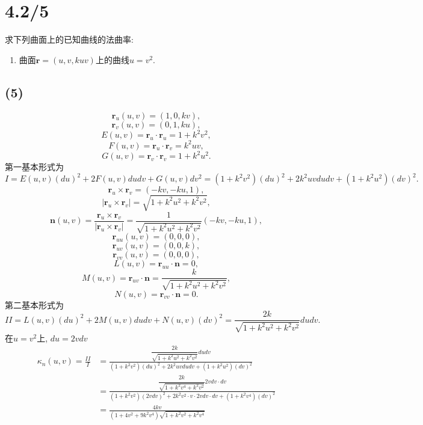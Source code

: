 \documentclass[11pt,a4paper]{article}
\begin{document}
\section{4.2/5}
\begin{problem}
求下列曲面上的已知曲线的法曲率:
\begin{enumerate}
  \addtocounter{enumi}{4}
  \item 曲面$\mathbf{r}=(u,v,kuv)$上的曲线$u=v^2$.
\end{enumerate}
\end{problem}

\subsection*{(5)}
$$\mathbf{r}_u(u,v)=(1,0,kv),$$
$$\mathbf{r}_v(u,v)=(0,1,ku),$$
$$E(u,v)=\mathbf{r}_u\cdot \mathbf{r}_u=1+k^2v^2,$$
$$F(u,v)=\mathbf{r}_u\cdot \mathbf{r}_v=k^2uv,$$
$$G(u,v)=\mathbf{r}_v\cdot \mathbf{r}_v=1+k^2u^2.$$
第一基本形式为
$$I=E(u,v)(du)^2+2F(u,v)dudv+G(u,v)dv^2=(1+k^2v^2)(du)^2+2k^2uvdudv+(1+k^2u^2)(dv)^2.$$
$$\mathbf{r}_u\times\mathbf{r}_v=(-kv,-ku,1),$$
$$|\mathbf{r}_u\times\mathbf{r}_v|=\sqrt{1+k^2u^2+k^2v^2},$$
$$\mathbf{n}(u,v)=\frac{\mathbf{r}_u\times\mathbf{r}_v}{|\mathbf{r}_u\times\mathbf{r}_v|}=\frac{1}{\sqrt{1+k^2u^2+k^2v^2}}(-kv,-ku,1),$$
$$\mathbf{r}_{uu}(u,v)=(0,0,0),$$
$$\mathbf{r}_{uv}(u,v)=(0,0,k),$$
$$\mathbf{r}_{vv}(u,v)=(0,0,0),$$
$$L(u,v)=\mathbf{r}_{uu}\cdot\mathbf{n}=0,$$
$$M(u,v)=\mathbf{r}_{uv}\cdot\mathbf{n}=\frac{k}{\sqrt{1+k^2u^2+k^2v^2}},$$
$$N(u,v)=\mathbf{r}_{vv}\cdot\mathbf{n}=0.$$
第二基本形式为
$$II=L(u,v)(du)^2+2M(u,v)dudv+N(u,v)(dv)^2=\frac{2k}{\sqrt{1+k^2u^2+k^2v^2}}dudv.$$
在$u=v^2$上, $du=2vdv$
\begin{align*}
  \kappa_n(u,v)=\frac{II}{I}
   & =\frac{\dfrac{2k}{\sqrt{1+k^2u^2+k^2v^2}}dudv}{(1+k^2v^2)(du)^2+2k^2uvdudv+(1+k^2u^2)(dv)^2}                                 \\
   & =\frac{\dfrac{2k}{\sqrt{1+k^2v^4+k^2v^2}}2vdv\cdot dv}{(1+k^2v^2)(2vdv)^2+2k^2v^2\cdot v\cdot 2vdv\cdot dv+(1+k^2v^4)(dv)^2} \\
   & =\frac{4 k v}{\left(1+4v^2+9 k^2 v^4\right) \sqrt{1+k^2v^2+k^2v^4}}
\end{align*}
\end{document}

